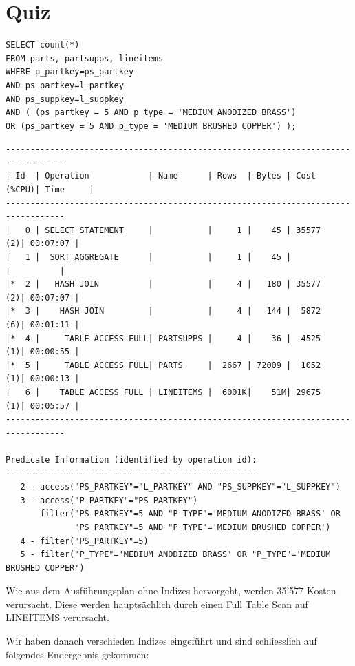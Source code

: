 \documentclass[10pt]{article}
\begin{document}
\section{Quiz}
\begin{lstlisting}[style=sql]
SELECT count(*)
FROM parts, partsupps, lineitems
WHERE p_partkey=ps_partkey
AND ps_partkey=l_partkey
AND ps_suppkey=l_suppkey
AND ( (ps_partkey = 5 AND p_type = 'MEDIUM ANODIZED BRASS')
OR (ps_partkey = 5 AND p_type = 'MEDIUM BRUSHED COPPER') );
\end{lstlisting}
\begin{lstlisting}[style=queryexecutionplan]
----------------------------------------------------------------------------------
| Id  | Operation            | Name      | Rows  | Bytes | Cost (%CPU)| Time     |
----------------------------------------------------------------------------------
|   0 | SELECT STATEMENT     |           |     1 |    45 | 35577   (2)| 00:07:07 |
|   1 |  SORT AGGREGATE      |           |     1 |    45 |            |          |
|*  2 |   HASH JOIN          |           |     4 |   180 | 35577   (2)| 00:07:07 |
|*  3 |    HASH JOIN         |           |     4 |   144 |  5872   (6)| 00:01:11 |
|*  4 |     TABLE ACCESS FULL| PARTSUPPS |     4 |    36 |  4525   (1)| 00:00:55 |
|*  5 |     TABLE ACCESS FULL| PARTS     |  2667 | 72009 |  1052   (1)| 00:00:13 |
|   6 |    TABLE ACCESS FULL | LINEITEMS |  6001K|    51M| 29675   (1)| 00:05:57 |
----------------------------------------------------------------------------------
 
Predicate Information (identified by operation id):
---------------------------------------------------
   2 - access("PS_PARTKEY"="L_PARTKEY" AND "PS_SUPPKEY"="L_SUPPKEY")
   3 - access("P_PARTKEY"="PS_PARTKEY")
       filter("PS_PARTKEY"=5 AND "P_TYPE"='MEDIUM ANODIZED BRASS' OR 
              "PS_PARTKEY"=5 AND "P_TYPE"='MEDIUM BRUSHED COPPER')
   4 - filter("PS_PARTKEY"=5)
   5 - filter("P_TYPE"='MEDIUM ANODIZED BRASS' OR "P_TYPE"='MEDIUM BRUSHED COPPER')
\end{lstlisting}
Wie aus dem Ausführungsplan ohne Indizes hervorgeht, werden 35'577 Kosten verursacht. Diese 
werden hauptsächlich durch einen Full Table Scan auf LINEITEMS verursacht.

\newpage
Wir haben danach verschieden Indizes eingeführt und sind schliesslich auf folgendes Endergebnis gekommen:
\end{document}
